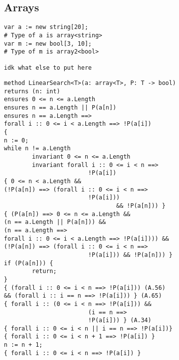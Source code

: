 \subsection{Arrays} 
\begin{multicols}{2}
\begin{tiny}
\begin{verbatim}
var a := new string[20];
# Type of a is array<string>
var m := new bool[3, 10];
# Type of m is array2<bool>

idk what else to put here
\end{verbatim}
\end{tiny}
\columnbreak
\begin{tiny}
\begin{verbatim}
method LinearSearch<T>(a: array<T>, P: T -> bool)
returns (n: int)
ensures 0 <= n <= a.Length
ensures n == a.Length || P(a[n])
ensures n == a.Length ==>
forall i :: 0 <= i < a.Length ==> !P(a[i])
{
n := 0;
while n != a.Length
        invariant 0 <= n <= a.Length
        invariant forall i :: 0 <= i < n ==>
                        !P(a[i])
{ 0 <= n < a.Length &&
(!P(a[n]) ==> (forall i :: 0 <= i < n ==>
                        !P(a[i])) 
                                && !P(a[n])) }
{ (P(a[n]) ==> 0 <= n <= a.Length &&
(n == a.Length || P(a[n])) &&
(n == a.Length ==>
forall i :: 0 <= i < a.Length ==> !P(a[i]))) &&
(!P(a[n]) ==> (forall i :: 0 <= i < n ==> 
                        !P(a[i])) && !P(a[n])) }
if (P(a[n])) {
        return;
}
{ (forall i :: 0 <= i < n ==> !P(a[i])) (A.56)
&& (forall i :: i == n ==> !P(a[i])) } (A.65)
{ forall i :: (0 <= i < n ==> !P(a[i])) &&
                        (i == n ==>
                        !P(a[i])) } (A.34)
{ forall i :: 0 <= i < n || i == n ==> !P(a[i])}
{ forall i :: 0 <= i < n + 1 ==> !P(a[i]) }
n := n + 1;
{ forall i :: 0 <= i < n ==> !P(a[i]) }
\end{verbatim}
\end{tiny}
\end{multicols}

